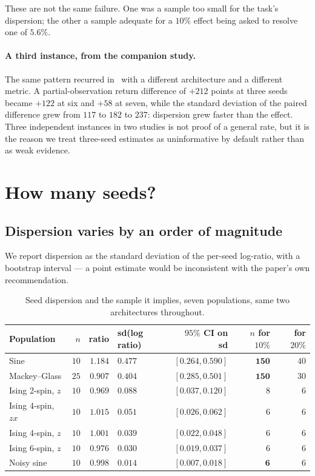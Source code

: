 \documentclass[11pt,onecolumn]{article}
\begin{document}
These are not the same failure. One was a sample too small for the
task's dispersion; the other a sample adequate for a $10\%$ effect being
asked to resolve one of $5.6\%$.

\paragraph{A third instance, from the companion study.}
The same pattern recurred in~\cite{paperb} with a different
architecture and a different metric. A partial-observation return
difference of $+212$ points at three seeds became $+122$ at six and
$+58$ at seven, while the standard deviation of the paired difference
grew from $117$ to $182$ to $237$: dispersion grew faster than the
effect. Three independent instances in two studies is not proof of a
general rate, but it is the reason we treat three-seed estimates as
uninformative by default rather than as weak evidence.

\section{How many seeds?}\label{sec:howmany}
\subsection{Dispersion varies by an order of magnitude}
\label{sec:dispersion}
We report dispersion as the standard deviation of the per-seed
log-ratio, with a bootstrap interval --- a point estimate would be
inconsistent with the paper's own recommendation.

\begin{table}[htb]\centering\small
\caption{Seed dispersion and the sample it implies, seven populations,
same two architectures throughout.}
\label{tab:dispersion}
\begin{tabular}{lrrlrrr}
\toprule
Population & $n$ & ratio & sd(log ratio) & $95\%$ CI on sd
  & $n$ for $10\%$ & for $20\%$ \\
\midrule
Sine                   & $10$ & $1.184$ & $\mathbf{0.477}$ & $[0.264, 0.590]$ & $\mathbf{150}$ & $40$ \\
Mackey--Glass          & $25$ & $0.907$ & $\mathbf{0.404}$ & $[0.285, 0.501]$ & $\mathbf{150}$ & $30$ \\
Ising 2-spin, $z$      & $10$ & $0.969$ & $0.088$ & $[0.037, 0.120]$ & $8$ & $6$ \\
Ising 4-spin, $zx$     & $10$ & $1.015$ & $0.051$ & $[0.026, 0.062]$ & $6$ & $6$ \\
Ising 4-spin, $z$      & $10$ & $1.001$ & $0.039$ & $[0.022, 0.048]$ & $6$ & $6$ \\
Ising 6-spin, $z$      & $10$ & $0.976$ & $0.030$ & $[0.019, 0.037]$ & $6$ & $6$ \\
Noisy sine             & $10$ & $0.998$ & $\mathbf{0.014}$ & $[0.007, 0.018]$ & $\mathbf{6}$ & $6$ \\
\bottomrule
\end{tabular}
\end{table}
\end{document}
